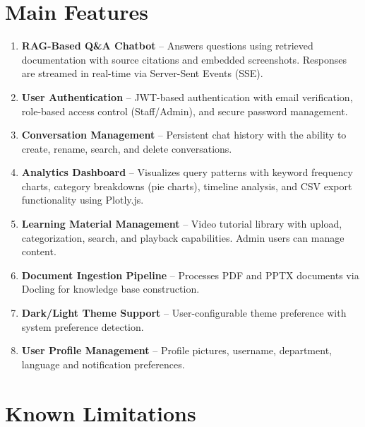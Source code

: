 \documentclass[a4paper,12pt]{report}
\begin{document}
\section{Main Features}

\begin{enumerate}
    \item \textbf{RAG-Based Q\&A Chatbot} -- Answers questions using retrieved documentation with source citations and embedded screenshots. Responses are streamed in real-time via Server-Sent Events (SSE).
    \item \textbf{User Authentication} -- JWT-based authentication with email verification, role-based access control (Staff/Admin), and secure password management.
    \item \textbf{Conversation Management} -- Persistent chat history with the ability to create, rename, search, and delete conversations.
    \item \textbf{Analytics Dashboard} -- Visualizes query patterns with keyword frequency charts, category breakdowns (pie charts), timeline analysis, and CSV export functionality using Plotly.js.
    \item \textbf{Learning Material Management} -- Video tutorial library with upload, categorization, search, and playback capabilities. Admin users can manage content.
    \item \textbf{Document Ingestion Pipeline} -- Processes PDF and PPTX documents via Docling for knowledge base construction.
    \item \textbf{Dark/Light Theme Support} -- User-configurable theme preference with system preference detection.
    \item \textbf{User Profile Management} -- Profile pictures, username, department, language and notification preferences.
\end{enumerate}

\section{Known Limitations}
\end{document}
